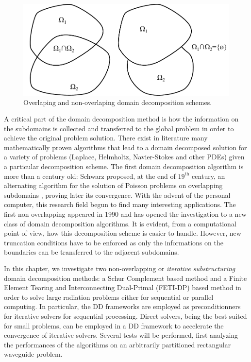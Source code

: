 \begin{figure}[ht]
\centering
\includegraphics[width=14cm]{DDnonoverlaping}
\caption{Overlaping and non-overlaping domain decomposition schemes.}
\label{fig:DDnonoverlaping}
\end{figure}

A critical part of the domain decomposition method is how the information on the subdomains is collected and transferred to the global problem in order to achieve the original problem solution. There exist in literature \cite{toselli2005domain, mathew2008domain} many mathematically proven algorithms that lead to a domain decomposed solution for a variety of problems (Laplace, Helmholtz, Navier-Stokes and other PDEs) given a particular decomposition scheme. The first domain decomposition algorithm is more than a century old: Schwarz proposed, at the end of $19^\mathrm{th}$ century, an alternating algorithm for the solution of Poisson problems on overlapping subdomains \cite{schwarz1972gesammelte}, proving later its convergence. With the advent of the personal computer, this research field begun to find many interesting applications. The first non-overlapping appeared in 1990 \cite{lions1990schwarz} and has opened the investigation to a new class of domain decomposition algorithms. It is evident, from a computational point of view, how this decomposition scheme is easier to handle. However, new truncation conditions have to be enforced as only the informations on the boundaries can be transferred to the adjacent subdomains.


In this chapter, we investigate two non-overlapping or \textit{iterative substructuring} domain decomposition methods: a Schur Complement based method and a Finite Element Tearing and Interconnecting Dual-Primal (FETI-DP) based method in order to solve large radiation problems either for sequential or parallel computing. In particular, the DD frameworks are employed as preconditionners for iterative solvers for sequential processing. Direct solvers, being the best suited for small problems, can be employed in a DD framework to accelerate the convergence of iterative solvers. Several tests will be performed, first analyzing the performances of the algorithms on an arbitrarily partitioned rectangular waveguide problem.

